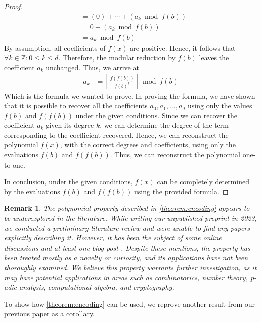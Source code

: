 \documentclass[11pt,reqno]{article}
\theoremstyle{plain}
\newtheorem{remark}{Remark}
\theoremstyle{definition}
\newcommand{\floor}[1]{\left\lfloor #1 \right\rfloor}
\begin{document}
\begin{proof}
\begin{align*}
&= (0) + \cdots + (a_{k} \bmod{f(b)}) \\
&= 0 + (a_{k} \bmod{f(b)}) \\
&= a_{k} \bmod{f(b)}
\end{align*}
By assumption, all coefficients of $f(x)$ are positive. Hence, it follows that $\forall k \in \mathbb{Z} : 0 \leq k \leq d$. Therefore, the modular reduction by $f(b)$ leaves the coefficient $a_k$ unchanged. Thus, we arrive at
\begin{align*}
a_k &= \floor{\frac{f(f(b))}{f(b)^{k}}} \bmod{f(b)}
\end{align*}
Which is the formula we wanted to prove. In proving the formula, we have shown that it is possible to recover all the coefficients $a_0, a_1, \ldots, a_d$ using only the values $f(b)$ and $f(f(b))$ under the given conditions. Since we can recover the coefficient $a_k$ given its degree $k$, we can determine the degree of the term corresponding to the coefficient recovered. Hence, we can reconstruct the polynomial $f(x)$, with the correct degrees and coefficients, using only the evaluations $f(b)$ and $f(f(b))$. Thus, we can reconstruct the polynomial one-to-one.

In conclusion, under the given conditions, $f(x)$ can be completely determined by the evaluations $f(b)$ and $f(f(b))$ using the provided formula.
\end{proof}

\begin{remark}
The polynomial property described in \cref{theorem:encoding} appears to be underexplored in the literature. While writing our unpublished preprint \cite{shunia2023simple} in 2023, we conducted a preliminary literature review and were unable to find any papers explicitly describing it. However, it has been the subject of some online discussions \cite{mathoverflow2012application, reddit2023determine} and at least one blog post \cite{jcook2012polynomial}. Despite these mentions, the property has been treated mostly as a novelty or curiosity, and its applications have not been thoroughly examined. We believe this property warrants further investigation, as it may have potential applications in areas such as combinatorics, number theory, p-adic analysis, computational algebra, and cryptography.
\end{remark}

To show how \cref{theorem:encoding} can be used, we reprove another result from our previous paper \cite{shunia2023simple} as a corollary.
\end{document}
